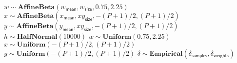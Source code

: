 \begin{algorithmic}[1]
                \State $w \sim \mathbf{AffineBeta}(w_\mathsf{mean}, w_\mathsf{size}, 0.75, 2.25)$
                \State $x \sim \mathbf{AffineBeta} \left( x_\mathsf{mean}, xy_\mathsf{size}, -(P+1)/2, (P+1)/2 \right) $
                \State $y \sim \mathbf{AffineBeta} \left( y_\mathsf{mean}, xy_\mathsf{size}, -(P+1)/2, (P+1)/2 \right)$
                \State $h \sim \mathbf{HalfNormal}(10000)$
                \State $w \sim \mathbf{Uniform}(0.75, 2.25)$
                \State $x \sim \mathbf{Uniform}(-(P+1)/2, (P+1)/2)$
                \State $y \sim \mathbf{Uniform}(-(P+1)/2, (P+1)/2)$
            \EndIf
        \EndFor
            \State $\delta \sim \mathbf{Empirical}( \delta_\mathsf{samples}, \delta_\mathsf{weights})$
        \EndFor
    \EndFor
\EndFor
\end{algorithmic}